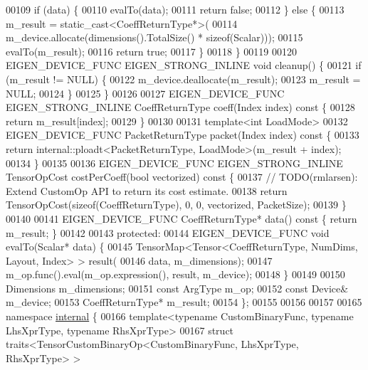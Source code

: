 \begin{DoxyCode}
00109     \textcolor{keywordflow}{if} (data) \{
00110       evalTo(data);
00111       \textcolor{keywordflow}{return} \textcolor{keyword}{false};
00112     \} \textcolor{keywordflow}{else} \{
00113       m\_result = \textcolor{keyword}{static\_cast<}CoeffReturnType*\textcolor{keyword}{>}(
00114           m\_device.allocate(dimensions().TotalSize() * \textcolor{keyword}{sizeof}(Scalar)));
00115       evalTo(m\_result);
00116       \textcolor{keywordflow}{return} \textcolor{keyword}{true};
00117     \}
00118   \}
00119 
00120   EIGEN\_DEVICE\_FUNC EIGEN\_STRONG\_INLINE \textcolor{keywordtype}{void} cleanup() \{
00121     \textcolor{keywordflow}{if} (m\_result != NULL) \{
00122       m\_device.deallocate(m\_result);
00123       m\_result = NULL;
00124     \}
00125   \}
00126 
00127   EIGEN\_DEVICE\_FUNC EIGEN\_STRONG\_INLINE CoeffReturnType coeff(Index index)\textcolor{keyword}{ const }\{
00128     \textcolor{keywordflow}{return} m\_result[index];
00129   \}
00130 
00131   \textcolor{keyword}{template}<\textcolor{keywordtype}{int} LoadMode>
00132   EIGEN\_DEVICE\_FUNC PacketReturnType packet(Index index)\textcolor{keyword}{ const }\{
00133     \textcolor{keywordflow}{return} internal::ploadt<PacketReturnType, LoadMode>(m\_result + index);
00134   \}
00135 
00136   EIGEN\_DEVICE\_FUNC EIGEN\_STRONG\_INLINE TensorOpCost costPerCoeff(\textcolor{keywordtype}{bool} vectorized)\textcolor{keyword}{ const }\{
00137     \textcolor{comment}{// TODO(rmlarsen): Extend CustomOp API to return its cost estimate.}
00138     \textcolor{keywordflow}{return} TensorOpCost(\textcolor{keyword}{sizeof}(CoeffReturnType), 0, 0, vectorized, PacketSize);
00139   \}
00140 
00141   EIGEN\_DEVICE\_FUNC CoeffReturnType* data()\textcolor{keyword}{ const }\{ \textcolor{keywordflow}{return} m\_result; \}
00142 
00143  \textcolor{keyword}{protected}:
00144   EIGEN\_DEVICE\_FUNC \textcolor{keywordtype}{void} evalTo(Scalar* data) \{
00145     TensorMap<Tensor<CoeffReturnType, NumDims, Layout, Index> > result(
00146         data, m\_dimensions);
00147     m\_op.func().eval(m\_op.expression(), result, m\_device);
00148   \}
00149 
00150   Dimensions m\_dimensions;
00151   \textcolor{keyword}{const} ArgType m\_op;
00152   \textcolor{keyword}{const} Device& m\_device;
00153   CoeffReturnType* m\_result;
00154 \};
00155 
00156 
00157 
00165 \textcolor{keyword}{namespace }\hyperlink{namespaceinternal}{internal} \{
00166 \textcolor{keyword}{template}<\textcolor{keyword}{typename} CustomBinaryFunc, \textcolor{keyword}{typename} LhsXprType, \textcolor{keyword}{typename} RhsXprType>
00167 \textcolor{keyword}{struct }traits<TensorCustomBinaryOp<CustomBinaryFunc, LhsXprType, RhsXprType> >

\end{DoxyCode}
